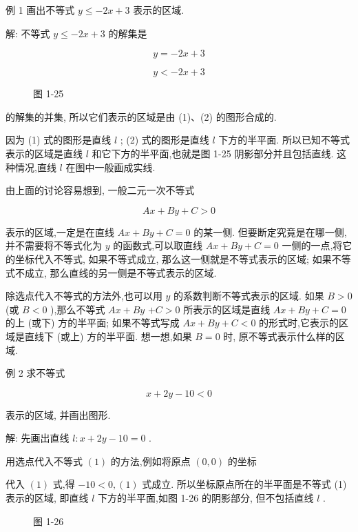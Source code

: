 \documentclass[lang=cn,newtx,10.5pt,scheme=chinese]{elegantbook}
\begin{document}
例 1 画出不等式 \(y \leq - {2x} + 3\) 表示的区域.

解: 不等式 \(y \leq - {2x} + 3\) 的解集是

\[
  y = - {2x} + 3 \tag{1}
\]

\[
  y < - {2x} + 3 \tag{2}
\]

\begin{figure}[h]
  \centering
  
  \caption{图 1-25}
\end{figure}

的解集的并集, 所以它们表示的区域是由 (1)、(2) 的图形合成的.

因为 (1) 式的图形是直线 \(l\) ; (2) 式的图形是直线 \(l\) 下方的半平面. 所以已知不等式表示的区域是直线 \(l\) 和它下方的半平面,也就是图 1-25 阴影部分并且包括直线. 这种情况,直线 \(l\) 在图中一般画成实线.

由上面的讨论容易想到, 一般二元一次不等式

\[
    {Ax} + {By} + C > 0
\]

表示的区域,一定是在直线 \({Ax} + {By} + C = 0\) 的某一侧. 但要断定究竟是在哪一侧,并不需要将不等式化为 \(y\) 的函数式,可以取直线 \({Ax} + {By} + C = 0\) 一侧的一点,将它的坐标代入不等式, 如果不等式成立, 那么这一侧就是不等式表示的区域; 如果不等式不成立, 那么直线的另一侧是不等式表示的区域.

除选点代入不等式的方法外,也可以用 \(y\) 的系数判断不等式表示的区域. 如果 \(B > 0\) (或 \(B < 0\) ),那么不等式 \({Ax} + {By}\) \(+ C > 0\) 所表示的区域是直线 \({Ax} + {By} + C = 0\) 的上 (或下) 方的半平面; 如果不等式写成 \({Ax} + {By} + C < 0\) 的形式时,它表示的区域是直线下 (或上) 方的半平面. 想一想,如果 \(B = 0\) 时, 原不等式表示什么样的区域.

例 2 求不等式

\[
  x + {2y} - {10} < 0 \tag{1}
\]

表示的区域, 并画出图形.

解: 先画出直线 \(l : x + {2y} - {10} = 0\) .

用选点代入不等式 \(\left( 1\right)\) 的方法,例如将原点 \(\left( {0,0}\right)\) 的坐标

代入 \(\left( 1\right)\) 式,得 \(- {10} < 0,\left( 1\right)\) 式成立. 所以坐标原点所在的半平面是不等式 (1) 表示的区域, 即直线 \(l\) 下方的半平面,如图 1-26 的阴影部分, 但不包括直线 \(l\) .

\begin{figure}[h]
  \centering
  
  \caption{图 1-26}
\end{figure}
\end{document}
